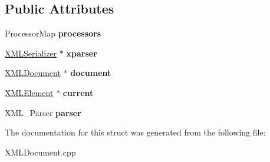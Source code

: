 \subsection*{Public Attributes}
\begin{DoxyCompactItemize}
\item 
Processor\+Map {\bfseries processors}\hypertarget{structXMLDOM_1_1XMLParserContext_a0297792354718a6a80d298b455701fd7}{}\label{structXMLDOM_1_1XMLParserContext_a0297792354718a6a80d298b455701fd7}

\item 
\hyperlink{classXMLDOM_1_1XMLSerializer}{X\+M\+L\+Serializer} $\ast$ {\bfseries xparser}\hypertarget{structXMLDOM_1_1XMLParserContext_a29723cbd8bec823e2dcb5ef38af20ed3}{}\label{structXMLDOM_1_1XMLParserContext_a29723cbd8bec823e2dcb5ef38af20ed3}

\item 
\hyperlink{classXMLDOM_1_1XMLDocument}{X\+M\+L\+Document} $\ast$ {\bfseries document}\hypertarget{structXMLDOM_1_1XMLParserContext_a27647e583801dc2b5d903948bec7d639}{}\label{structXMLDOM_1_1XMLParserContext_a27647e583801dc2b5d903948bec7d639}

\item 
\hyperlink{classXMLDOM_1_1XMLElement}{X\+M\+L\+Element} $\ast$ {\bfseries current}\hypertarget{structXMLDOM_1_1XMLParserContext_a0c481501af8e495ae5b6d81efbc27832}{}\label{structXMLDOM_1_1XMLParserContext_a0c481501af8e495ae5b6d81efbc27832}

\item 
X\+M\+L\+\_\+\+Parser {\bfseries parser}\hypertarget{structXMLDOM_1_1XMLParserContext_a636440d42a525803e9adc6221b410d33}{}\label{structXMLDOM_1_1XMLParserContext_a636440d42a525803e9adc6221b410d33}

\end{DoxyCompactItemize}


The documentation for this struct was generated from the following file\+:\begin{DoxyCompactItemize}
\item 
X\+M\+L\+Document.\+cpp\end{DoxyCompactItemize}
